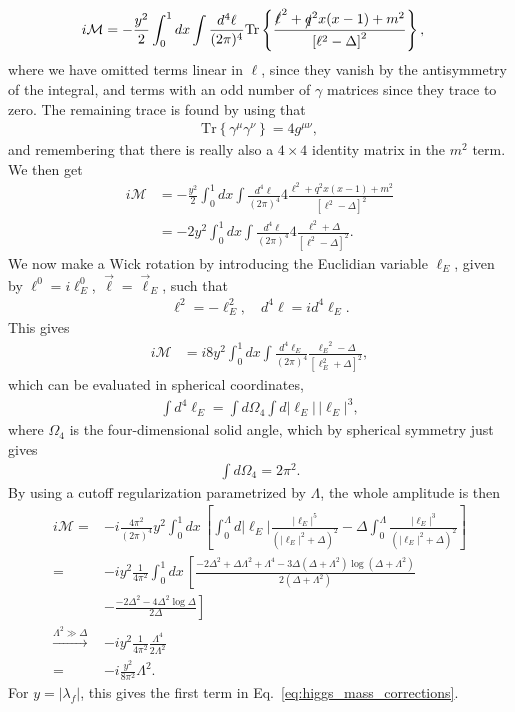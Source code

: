 \documentclass[twoside,english]{uiofysmaster}
\begin{document}
\begin{align}
	i\mathcal{M} &= -\frac{y^2}{2}\int_0^1 dx \int \frac{d^4\ell}{(2\pi)^4} \mathrm{Tr}\left\{ \frac{ \slashed{\ell}^2 + \slashed{q}^2x(x-1) + m^2}{\left[ \ell^2 - \Delta \right]^2}  \right\},
\end{align}
where we have omitted terms linear in $\ell$, since they vanish by the antisymmetry of the integral, and terms with an odd number of $\gamma$ matrices since they trace to zero. The remaining trace is found by using that
\begin{align}
	\mathrm{Tr} \left\{ \gamma^\mu \gamma^\nu\right\} = 4g^{\mu\nu},
\end{align}
and remembering that there is really also a $4\times 4$ identity matrix in the $m^2$ term. We then get
\begin{align}
	i\mathcal{M} &= -\frac{y^2}{2}\int_0^1 dx \int \frac{d^4\ell}{(2\pi)^4} 4 \frac{ {\ell}^2 + {q}^2x(x-1) + m^2}{\left[ \ell^2 - \Delta \right]^2}  \\
				&= -2y^2\int_0^1 dx \int \frac{d^4\ell}{(2\pi)^4} 4 \frac{ {\ell}^2 + \Delta}{\left[ \ell^2 - \Delta \right]^2}.\nonumber
\end{align}
We now make a Wick rotation by introducing the Euclidian variable $\ell_E$, given by $\ell^0 = i\ell^0_E$, $\vec\ell = \vec\ell_E$, such that
\begin{align}
	\ell^2 = -\ell_E^2, \quad d^4\ell = id^4\ell_E.
\end{align}
This gives
\begin{align}
	i\mathcal{M} &= i8y^2\int_0^1 dx \int \frac{d^4\ell_E}{(2\pi)^4}  \frac{ {\ell_E}^2 - \Delta}{\left[ \ell_E^2 + \Delta \right]^2}, 
\end{align}
which can be evaluated in spherical coordinates,
\begin{align}
	\int d^4\ell_E = \int d\Omega_4 \int d|\ell_E| \, |\ell_E|^3,
\end{align}
where $\Omega_4$ is the four-dimensional solid angle, which by spherical symmetry just gives
\begin{align}
	 \int d\Omega_4 = 2\pi^2.
\end{align}
By using a cutoff regularization parametrized by $\Lambda$, the whole amplitude is then
\begin{align}
	i\mathcal{M} = &-i\frac{4\pi^2}{(2\pi)^4}y^2 \int_0^1 dx\, \left[ \int_0^\Lambda d|\ell_E| \frac{|\ell_E|^5}{\left(|\ell_E|^2 + \Delta\right)^2} - \Delta \int_0^\Lambda \frac{|\ell_E|^3}{\left( |\ell_E|^2 + \Delta \right)^2}\right]\nonumber \\
	= &-iy^2\frac{1}{4\pi^2}\int_0^1 dx \, \left[ \frac{-2\Delta^2 + \Delta \Lambda^2 + \Lambda^4 - 3\Delta\left( \Delta + \Lambda^2\right)\log \left(\Delta + \Lambda^2\right)}{2\left(\Delta + \Lambda^2\right)} \right.\nonumber \\
	&-\left. \frac{-2\Delta^2 - 4\Delta^2\log\Delta}{2\Delta}\right]\\
	\overset{\Lambda^2 \gg \Delta}{\to} &-iy^2\frac{1}{4\pi^2} \frac{\Lambda^4}{2\Lambda^2}\nonumber \\
	= &-i\frac{y^2}{8\pi^2}\Lambda^2.\nonumber
\end{align}
For $y = |\lambda_f|$, this gives the first term in Eq.\ \eqref{eq:higgs_mass_corrections}.
\end{document}
